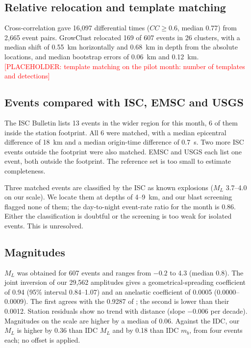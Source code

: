 \documentclass[11pt]{article}
\newcommand{\placeholder}[1]{\textcolor{red}{[PLACEHOLDER: #1]}}
\begin{document}
\subsection{Relative relocation and template matching}
Cross-correlation gave 16,097 differential times ($CC \ge 0.6$, median 0.77) from 2,665 event pairs. GrowClust relocated 169 of 607 events in 26 clusters, with a median shift of 0.55~km horizontally and 0.68~km in depth from the absolute locations, and median bootstrap errors of 0.06~km and 0.12~km. \placeholder{template matching on the pilot month: number of templates and detections}

\subsection{Events compared with ISC, EMSC and USGS}
The ISC Bulletin lists 13 events in the wider region for this month, 6 of them inside the station footprint. All 6 were matched, with a median epicentral difference of 18~km and a median origin-time difference of 0.7~s. Two more ISC events outside the footprint were also matched. EMSC and USGS each list one event, both outside the footprint. The reference set is too small to estimate completeness.

Three matched events are classified by the ISC as known explosions ($M_L$ 3.7--4.0 on our scale). We locate them at depths of 4--9~km, and our blast screening flagged none of them; the day-to-night event-rate ratio for the month is 0.86. Either the classification is doubtful or the screening is too weak for isolated events. This is unresolved.

\subsection{Magnitudes}
$M_L$ was obtained for 607 events and ranges from $-0.2$ to 4.3 (median 0.8). The joint inversion of our 29,562 amplitudes gives a geometrical-spreading coefficient of 0.94 (95\% interval 0.84--1.07) and an anelastic coefficient of 0.0005 (0.0000--0.0009). The first agrees with the 0.9287 of \citet{ganbat2026ml}; the second is lower than their 0.0012. Station residuals show no trend with distance (slope $-0.006$ per decade). Magnitudes on the \citet{hutton1987} scale are higher by a median of 0.06. Against the IDC, our $M_L$ is higher by 0.36 than IDC $M_L$ and by 0.18 than IDC $m_b$, from four events each; no offset is applied.

\end{document}
